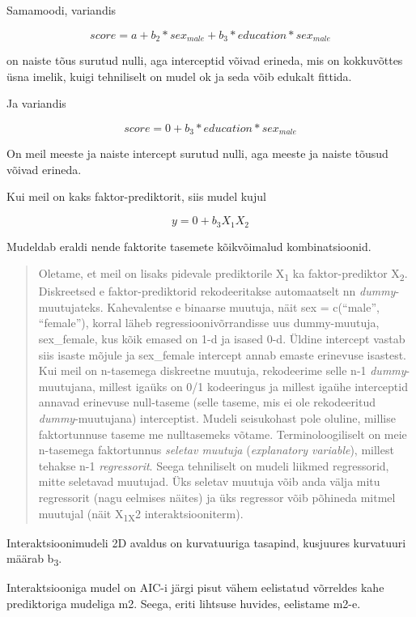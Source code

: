 \documentclass[]{book}
\begin{document}
Samamoodi, variandis

\[score = a +  b_2 * sex_{male} + b_3 * education * sex_{male}\]

on naiste tõus surutud nulli, aga interceptid võivad erineda, mis on
kokkuvõttes üsna imelik, kuigi tehniliselt on mudel ok ja seda võib
edukalt fittida.

Ja variandis

\[score = 0 + b_3 * education * sex_{male}\]

On meil meeste ja naiste intercept surutud nulli, aga meeste ja naiste
tõusud võivad erineda.

Kui meil on kaks faktor-prediktorit, siis mudel kujul

\[y= 0 + b_3X_1X_2\]

Mudeldab eraldi nende faktorite tasemete kõikvõimalud kombinatsioonid.

\begin{quote}
Oletame, et meil on lisaks pidevale prediktorile X\textsubscript{1} ka
faktor-prediktor X\textsubscript{2}. Diskreetsed e faktor-prediktorid
rekodeeritakse automaatselt nn \emph{dummy}-muutujateks. Kahevalentse e
binaarse muutuja, näit sex = c(``male'', ``female''), korral läheb
regressioonivõrrandisse uus dummy-muutuja, sex\_female, kus kõik emased
on 1-d ja isased 0-d. Üldine intercept vastab siis isaste mõjule ja
sex\_female intercept annab emaste erinevuse isastest. Kui meil on
n-tasemega diskreetne muutuja, rekodeerime selle n-1
\emph{dummy}-muutujana, millest igaüks on 0/1 kodeeringus ja millest
igaühe interceptid annavad erinevuse null-taseme (selle taseme, mis ei
ole rekodeeritud \emph{dummy}-muutujana) interceptist. Mudeli
seisukohast pole oluline, millise faktortunnuse taseme me nulltasemeks
võtame. Terminoloogiliselt on meie n-tasemega faktortunnus \emph{seletav
muutuja} (\emph{explanatory variable}), millest tehakse n-1
\emph{regressorit}. Seega tehniliselt on mudeli liikmed regressorid,
mitte seletavad muutujad. Üks seletav muutuja võib anda välja mitu
regressorit (nagu eelmises näites) ja üks regressor võib põhineda mitmel
muutujal (näit X\textsubscript{1X}2 interaktsiooniterm).
\end{quote}

Interaktsioonimudeli 2D avaldus on kurvatuuriga tasapind, kusjuures
kurvatuuri määrab b\textsubscript{3}.

Interaktsiooniga mudel on AIC-i järgi pisut vähem eelistatud võrreldes
kahe prediktoriga mudeliga m2. Seega, eriti lihtsuse huvides, eelistame
m2-e.
\end{document}
